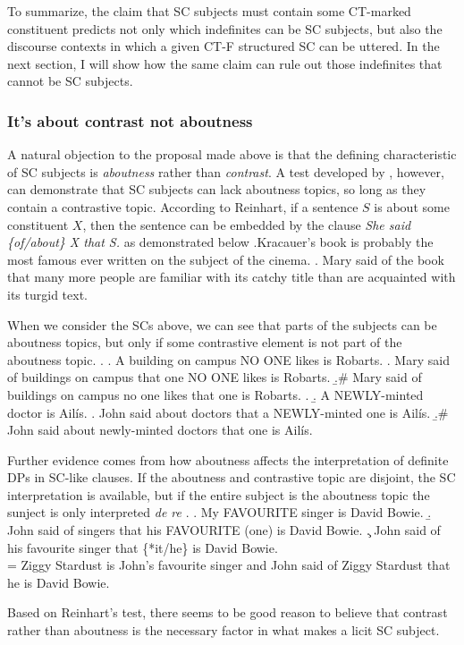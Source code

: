 \documentclass[GPFinal]{subfiles}
\begin{document}
To summarize, the claim that SC subjects must contain some CT-marked constituent predicts not only which indefinites can be SC subjects, but also the discourse contexts in which a given CT-F structured SC can be uttered.
In the next section, I will show how the same claim can rule out those indefinites that cannot be SC subjects.
\subsubsection{It's about contrast not aboutness}
A natural objection to the proposal made above is that the defining characteristic of SC subjects is \textit{aboutness} rather than \textit{contrast}.
A test developed by \textcite{reinhart1981pragmatics}, however, can demonstrate that SC subjects can lack aboutness topics, so long as they contain a contrastive topic.
According to Reinhart, if a sentence $S$ is about some constituent $X$, then the sentence can be embedded by the clause \textit{She said \{of/about\} X that S.} as demonstrated below
\ex.Kracauer's book is probably the most famous ever written on the subject of the cinema.
\a. Mary said of the book that many more people are familiar with its catchy title than are acquainted with its turgid text.\hfill\parencite{reinhart1981pragmatics}

When we consider the SCs above, we can see that parts of the subjects can be aboutness topics, but only if some contrastive element is not part of the aboutness topic.
\ex.
\a. A building on campus NO ONE likes is Robarts.
\a. Mary said of buildings on campus that one NO ONE likes is Robarts.
\b.\# Mary said of buildings on campus no one likes that one is Robarts.
\z.
\b. A NEWLY-minted doctor is Ail\'is.
\a. John said about doctors that a NEWLY-minted one is Ail\'is.
\b.\# John said about newly-minted doctors that one is Ail\'is.

Further evidence comes from how aboutness affects the interpretation of definite DPs in SC-like clauses.
If the aboutness and contrastive topic are disjoint, the SC interpretation is available, but if the entire subject is the aboutness topic the sunject is only interpreted \textit{de re}
\ex. 
\a. My FAVOURITE singer is David Bowie.
\b. John said of singers that his FAVOURITE (one) is David Bowie.
\c. John said of his favourite singer that \{*it/he\} is David Bowie.\\
= Ziggy Stardust is John's favourite singer and John said of Ziggy Stardust that he is David Bowie.

Based on Reinhart's test, there seems to be good reason to believe that contrast rather than aboutness is the necessary factor in what makes a licit SC subject.
\end{document}
